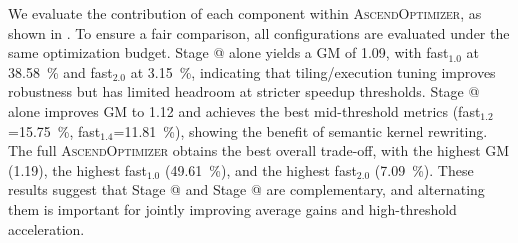 \documentclass{article}
\makeatletter
\theoremstyle{plain}
\theoremstyle{definition}
\theoremstyle{remark}
\newcommand{\Rmnum}[1]{\expandafter\@slowromancap\romannumeral #1@}
\makeatother
\begin{document}
We evaluate the contribution of each component within \textsc{AscendOptimizer}, as shown in . To ensure a fair comparison, all configurations are evaluated under the same optimization budget. Stage \Rmnum{1} alone yields a GM of 1.09, with fast$_{1.0}$ at \SI{38.58}{\percent} and fast$_{2.0}$ at \SI{3.15}{\percent}, indicating that tiling/execution tuning improves robustness but has limited headroom at stricter speedup thresholds. Stage \Rmnum{2} alone improves GM to 1.12 and achieves the best mid-threshold metrics (fast$_{1.2}$=\SI{15.75}{\percent}, fast$_{1.4}$=\SI{11.81}{\percent}), showing the benefit of semantic kernel rewriting. The full \textsc{AscendOptimizer} obtains the best overall trade-off, with the highest GM (1.19), the highest fast$_{1.0}$ (\SI{49.61}{\percent}), and the highest fast$_{2.0}$ (\SI{7.09}{\percent}). These results suggest that Stage \Rmnum{1} and Stage \Rmnum{2} are complementary, and alternating them is important for jointly improving average gains and high-threshold acceleration.
\end{document}
